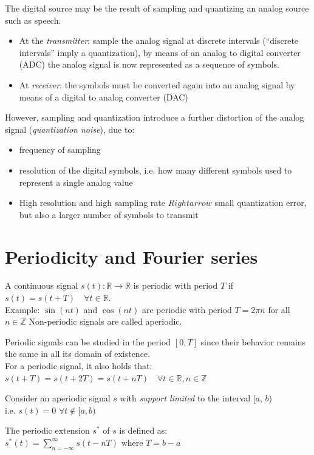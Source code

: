 The digital source may be the result of sampling and quantizing an analog source
such as speech.
\begin{itemize}
   \item 
   At the \textit{transmitter}:
   sample the analog signal at discrete intervals (``discrete intervals'' imply a quantization), by
   means of an analog to digital converter (ADC)
   the analog signal is now represented as a sequence of symbols.
   \item
   At \textit{receiver}:
   the symbols must be converted again into an analog signal
   by means of a digital to analog converter (DAC)
\end{itemize}


However, sampling and quantization introduce a further distortion of the analog signal (\textit{quantization noise}), due to:
\begin{itemize}
   \item frequency of sampling
   \item resolution of the digital symbols, i.e. how many different symbols used to represent a single analog value
   \item[]
   High resolution and high sampling rate $Rightarrow$ small quantization error, but also a larger number of symbols to transmit
\end{itemize}

\section{Periodicity and Fourier series}

\begin{definition}
   
   A continuous signal $s(t): \mathbb{R} \rightarrow \mathbb{R}$ is periodic with period $T$ if
   $s(t) = s(t + T) \quad \forall t \in \mathbb{R}$.\\
   Example: $\sin(nt)$ and $\cos(nt)$ are periodic with period $T = 2\pi n$ for all $n \in \mathbb{Z}$
   Non-periodic signals are called aperiodic.

   Periodic signals can be studied in the period $[0, T]$ since their behavior remains the same in all its domain of existence.\\
   For a periodic signal, it also holds that:
   $s(t + T) = s(t + 2T) = s(t + nT) \quad \forall t \in \mathbb{R}, n \in \mathbb{Z}$
\end{definition}

\begin{definition}
   
   Consider an aperiodic signal $s$ with \textit{support limited} to the interval [$a$, $b$)\\
   i.e. $s(t) = 0$ $\forall t \notin [a, b)$
   
   The periodic extension $s^*$ of $s$ is defined as:
   $s^*(t) = \sum_{n=-\infty}^{\infty} s(t - nT) \text{ where } T = b - a$
   
\end{definition}

